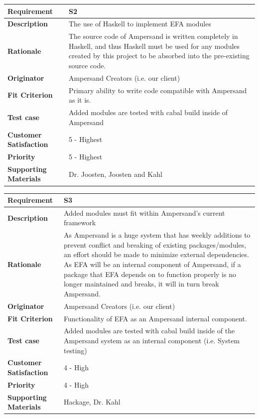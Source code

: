 \documentclass[12pt]{report}
\begin{document}
{\setlength{\tabcolsep}{6pt} %
    \begin{tabularx}{\textwidth}{>{\bfseries}m{3cm}X}
        Requirement & S2 \\ 
        \midrule
        \endhead
        Description  & The use of Haskell to implement EFA modules
        \\	Rationale & The source code of Ampersand is written completely in 
        Haskell, and thus Haskell must be used for any modules created by this 
        project to be absorbed into the pre-existing source code.
        \\	Originator & Ampersand Creators (i.e. our client)        
        \\	Fit Criterion & Primary ability to write code compatible with 
        Ampersand as it is.
        \\ Test case & Added modules are tested with cabal build inside of 
        Ampersand
        \\	Customer Satisfaction & 5 - Highest 
        \\	Priority & 5 - Highest 
        \\	Supporting Materials & Dr. Joosten, Joosten and Kahl
        \vspace{12pt}
    \end{tabularx}
}
{\setlength{\tabcolsep}{6pt} %
    \begin{tabularx}{\textwidth}{>{\bfseries}m{3cm}X}
        Requirement & S3 \\ 
        \midrule
        \endhead
        Description  & Added modules must fit within Ampersand's current 
        framework
        \\	Rationale & As Ampersand is a huge system that has weekly additions 
        to prevent conflict and breaking of existing packages/modules, an 
        effort should be made to minimize external dependencies. As EFA will be 
        an internal component of Ampersand, if a package that EFA depends on to 
        function properly is no longer maintained and breaks, it will in turn 
        break Ampersand.
        \\	Originator & Ampersand Creators (i.e. our client)        
        \\	Fit Criterion & Functionality of EFA as an Ampersand internal 
        component.
        \\ Test case & Added modules are tested with cabal build inside of the
        Ampersand system as an internal component (i.e. System testing)
        \\	Customer Satisfaction & 4 - High 
        \\	Priority & 4 - High
        \\	Supporting Materials & Hackage, Dr. Kahl
        \vspace{12pt}
    \end{tabularx}
}
\end{document}
